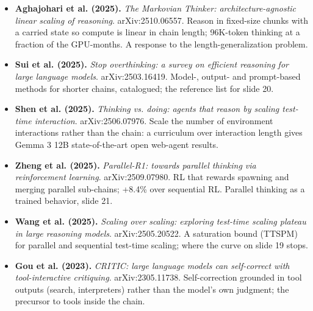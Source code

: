 \documentclass[11pt,letterpaper]{article}
\begin{document}
\begin{itemize}[leftmargin=1.2em,itemsep=3pt]
\item \textbf{Aghajohari et al. (2025).} \textit{The Markovian Thinker: architecture-agnostic linear scaling of reasoning}. arXiv:2510.06557. Reason in fixed-size chunks with a carried state so compute is linear in chain length; 96K-token thinking at a fraction of the GPU-months. A response to the length-generalization problem.
\item \textbf{Sui et al. (2025).} \textit{Stop overthinking: a survey on efficient reasoning for large language models}. arXiv:2503.16419. Model-, output- and prompt-based methods for shorter chains, catalogued; the reference list for slide 20.
\item \textbf{Shen et al. (2025).} \textit{Thinking vs. doing: agents that reason by scaling test-time interaction}. arXiv:2506.07976. Scale the number of environment interactions rather than the chain: a curriculum over interaction length gives Gemma 3 12B state-of-the-art open web-agent results.
\item \textbf{Zheng et al. (2025).} \textit{Parallel-R1: towards parallel thinking via reinforcement learning}. arXiv:2509.07980. RL that rewards spawning and merging parallel sub-chains; +8.4\% over sequential RL. Parallel thinking as a trained behavior, slide 21.
\item \textbf{Wang et al. (2025).} \textit{Scaling over scaling: exploring test-time scaling plateau in large reasoning models}. arXiv:2505.20522. A saturation bound (TTSPM) for parallel and sequential test-time scaling; where the curve on slide 19 stops.
\item \textbf{Gou et al. (2023).} \textit{CRITIC: large language models can self-correct with tool-interactive critiquing}. arXiv:2305.11738. Self-correction grounded in tool outputs (search, interpreters) rather than the model's own judgment; the precursor to tools inside the chain.
\end{itemize}
\end{document}
